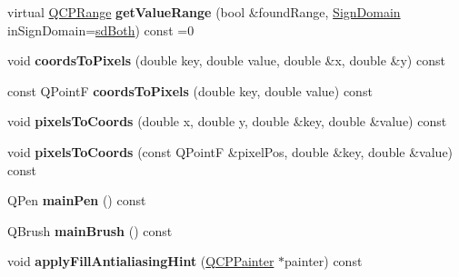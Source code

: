 \begin{DoxyCompactItemize}
\item 
\hypertarget{classQCPAbstractPlottable_aa3331b415b5939fe4df60b78831b2799}{virtual \hyperlink{classQCPRange}{\-Q\-C\-P\-Range} {\bfseries get\-Value\-Range} (bool \&found\-Range, \hyperlink{classQCPAbstractPlottable_a661743478a1d3c09d28ec2711d7653d8}{\-Sign\-Domain} in\-Sign\-Domain=\hyperlink{classQCPAbstractPlottable_a661743478a1d3c09d28ec2711d7653d8a082b98cfb91a7363a3b5cd17b0c1cd60}{sd\-Both}) const =0}\label{classQCPAbstractPlottable_aa3331b415b5939fe4df60b78831b2799}

\item 
\hypertarget{classQCPAbstractPlottable_ade710a776104b14c1c835168ce1bfc5c}{void {\bfseries coords\-To\-Pixels} (double key, double value, double \&x, double \&y) const }\label{classQCPAbstractPlottable_ade710a776104b14c1c835168ce1bfc5c}

\item 
\hypertarget{classQCPAbstractPlottable_a9fd1c9df8391781f05b0be22fbe91e13}{const \-Q\-Point\-F {\bfseries coords\-To\-Pixels} (double key, double value) const }\label{classQCPAbstractPlottable_a9fd1c9df8391781f05b0be22fbe91e13}

\item 
\hypertarget{classQCPAbstractPlottable_a10408828446e9e0681c46d65120f382e}{void {\bfseries pixels\-To\-Coords} (double x, double y, double \&key, double \&value) const }\label{classQCPAbstractPlottable_a10408828446e9e0681c46d65120f382e}

\item 
\hypertarget{classQCPAbstractPlottable_a3e2c361cfcdfd5d803ada4d333a07e15}{void {\bfseries pixels\-To\-Coords} (const \-Q\-Point\-F \&pixel\-Pos, double \&key, double \&value) const }\label{classQCPAbstractPlottable_a3e2c361cfcdfd5d803ada4d333a07e15}

\item 
\hypertarget{classQCPAbstractPlottable_a19276ed2382a3a06464417b8788b1451}{\-Q\-Pen {\bfseries main\-Pen} () const }\label{classQCPAbstractPlottable_a19276ed2382a3a06464417b8788b1451}

\item 
\hypertarget{classQCPAbstractPlottable_ae74c123832da180c17e22203e748d9b7}{\-Q\-Brush {\bfseries main\-Brush} () const }\label{classQCPAbstractPlottable_ae74c123832da180c17e22203e748d9b7}

\item 
\hypertarget{classQCPAbstractPlottable_ac08a480155895e674dbfe5a5670e0ff3}{void {\bfseries apply\-Fill\-Antialiasing\-Hint} (\hyperlink{classQCPPainter}{\-Q\-C\-P\-Painter} $\ast$painter) const }\label{classQCPAbstractPlottable_ac08a480155895e674dbfe5a5670e0ff3}


\end{DoxyCompactItemize}
